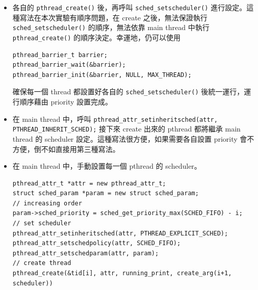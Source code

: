 \documentclass{res}
\begin{document}
\begin{resume}
\begin{itemize}
	\item 各自的 \lstinline{pthread_create()} 後，再呼叫 \lstinline{sched_setscheduler()} 進行設定。這種寫法在本次實驗有順序問題，在 create 之後，無法保證執行 \lstinline{sched_setscheduler()} 的順序，無法依靠 main thread 中執行 \lstinline{pthread_create()} 的順序決定。幸運地，仍可以使用 
\begin{lstlisting}
pthread_barrier_t barrier; 
pthread_barrier_wait(&barrier);
pthread_barrier_init(&barrier, NULL, MAX_THREAD);
\end{lstlisting}

確保每一個 thread 都設置好各自的 \lstinline{sched_setscheduler()} 後統一運行，運行順序藉由 priority 設置完成。

	\item 在 main thread 中，呼叫 \lstinline{pthread_attr_setinheritsched(attr, PTHREAD_INHERIT_SCHED);} 接下來 create 出來的 pthread 都將繼承 main thread 的 scheduler 設定。這種寫法很方便，如果需要各自設置 priority 會不方便，倒不如直接用第三種寫法。
	\item 在 main thread 中，手動設置每一個 pthread 的 scheduler。
\begin{lstlisting}[frame=single]
pthread_attr_t *attr = new pthread_attr_t;
struct sched_param *param = new struct sched_param;
// increasing order
param->sched_priority = sched_get_priority_max(SCHED_FIFO) - i;
// set scheduler
pthread_attr_setinheritsched(attr, PTHREAD_EXPLICIT_SCHED);
pthread_attr_setschedpolicy(attr, SCHED_FIFO);
pthread_attr_setschedparam(attr, param);
// create thread
pthread_create(&tid[i], attr, running_print, create_arg(i+1, scheduler))
\end{lstlisting}

\end{itemize}

\hspace*{.1in} 


\end{resume}
\end{document}
